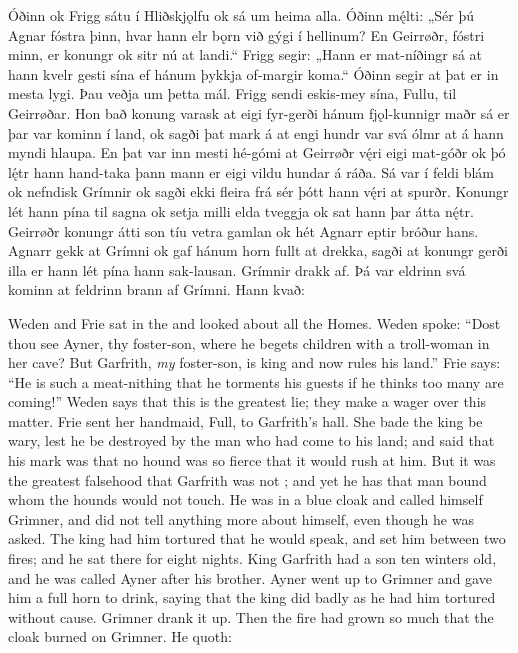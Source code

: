 \bpg\bpa{}%
Óðinn ok Frigg sátu í Hliðskjǫlfu ok sá um heima alla.
Óðinn mę́lti: „Sér þú Agnar fóstra þinn, hvar hann elr bǫrn við gýgi í hellinum?
En Geirrøðr, fóstri minn, er konungr ok sitr nú at landi.“
Frigg segir: „Hann er mat-níðingr sá at hann kvelr gesti sína ef hánum þykkja of-margir koma.“
Óðinn segir at þat er in mesta lygi. Þau veðja um þetta mál.
Frigg sendi eskis-mey sína, Fullu, til Geirrøðar. Hon bað konung varask at eigi fyr-gerði hánum fjǫl-kunnigr maðr sá er þar var kominn í land, ok sagði þat mark á at engi hundr var svá ólmr at á hann myndi hlaupa.
En þat var inn mesti hé-gómi at Geirrøðr vę́ri eigi mat-góðr ok þó lę́tr hann hand-taka þann mann er eigi vildu hundar á ráða.
Sá var í feldi blám ok nefndisk Grímnir ok sagði ekki fleira frá sér þótt hann vę́ri at spurðr.
Konungr lét hann pína til sagna ok setja milli elda tveggja ok sat hann þar átta nę́tr.
Geirrøðr konungr átti son tíu vetra gamlan ok hét Agnarr eptir bróður hans.
Agnarr gekk at Grímni ok gaf hánum horn fullt at drekka, sagði at konungr gerði illa er hann lét pína hann sak-lausan.
Grímnir drakk af. Þá var eldrinn svá kominn at feldrinn brann af Grímni. Hann kvað:\epa

\bpb Weden and Frie sat in the  and looked about all the Homes.
Weden spoke: “Dost thou see Ayner, thy foster-son, where he begets children with a troll-woman in her cave?
But Garfrith, \emph{my} foster-son, is king and now rules his land.”
Frie says: “He is such a meat-nithing that he torments his guests if he thinks too many are coming!”
Weden says that this is the greatest lie; they make a wager over this matter.
Frie sent her handmaid, Full, to Garfrith’s hall. She bade the king be wary, lest he be destroyed by the  man who had come to his land; and said that his mark was that no hound was so fierce that it would rush at him.
But it was the greatest falsehood that Garfrith was not ; and yet he has that man bound whom the hounds would not touch.
He was in a blue cloak and called himself Grimner, and did not tell anything more about himself, even though he was asked.
The king had him tortured that he would speak, and set him between two fires; and he sat there for eight nights.
King Garfrith had a son ten winters old, and he was called Ayner after his brother.
Ayner went up to Grimner and gave him a full horn to drink, saying that the king did badly as he had him tortured without cause.
Grimner drank it up. Then the fire had grown so much that the cloak burned on Grimner. He quoth:\epb\epg{}


